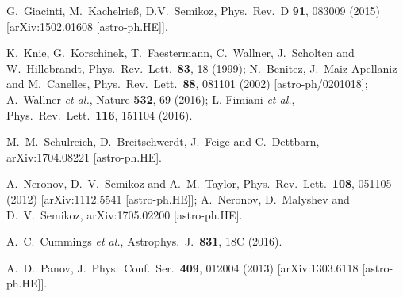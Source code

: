 \documentclass[prd,aps,twocolumn]{revtex4}
\begin{document}
\begin{thebibliography}{99}
  G.~Giacinti, M.~Kachelrie{\ss}, D.V.~Semikoz,
Phys.\ Rev.\ D {\bf 91}, 083009 (2015)
  [arXiv:1502.01608 [astro-ph.HE]].

  
  K.~Knie, G.~Korschinek, T.~Faestermann, C.~Wallner, J.~Scholten and W.~Hillebrandt,
  Phys.\ Rev.\ Lett.\  {\bf 83}, 18 (1999);
    N.~Benitez, J.~Maiz-Apellaniz and M.~Canelles,
  Phys.\ Rev.\ Lett.\  {\bf 88}, 081101 (2002)
  [astro-ph/0201018];
A.~Wallner {\it et al.},
Nature {\bf 532}, 69 (2016);
L. Fimiani {\it et al.}, %
Phys.\ Rev.\ Lett.\  {\bf 116}, 151104 (2016).


  M.~M.~Schulreich, D.~Breitschwerdt, J.~Feige and C.~Dettbarn,
  arXiv:1704.08221 [astro-ph.HE].


A.~Neronov, D.~V.~Semikoz and A.~M.~Taylor,
  Phys.\ Rev.\ Lett.\  {\bf 108}, 051105 (2012)
  [arXiv:1112.5541 [astro-ph.HE]];
A.~Neronov, D.~Malyshev and D.~V.~Semikoz,
  arXiv:1705.02200 [astro-ph.HE].

A.~C.~Cummings {\it et al.}, 
Astrophys.\ J.\  {\bf 831}, 18C (2016).



A.~D.~Panov,
  J.\ Phys.\ Conf.\ Ser.\  {\bf 409}, 012004 (2013)
  [arXiv:1303.6118 [astro-ph.HE]].




\end{thebibliography}
\end{document}
